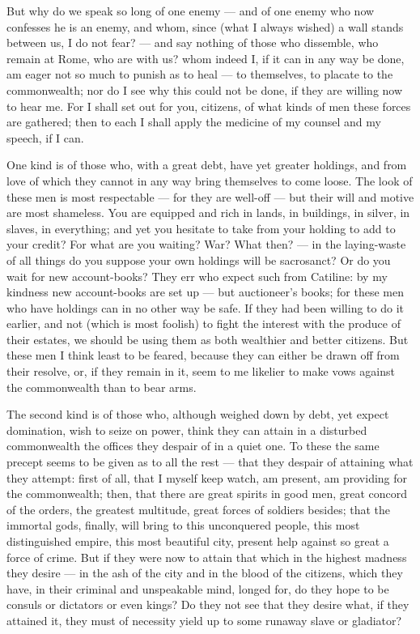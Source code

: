  But why do we speak so long of one enemy --- and of one enemy who now confesses he is an enemy, and whom, since (what I always wished) a wall stands between us, I do not fear? --- and say nothing of those who dissemble, who remain at Rome, who are with us? whom indeed I, if it can in any way be done, am eager not so much to punish as to heal --- to themselves, to placate to the commonwealth; nor do I see why this could not be done, if they are willing now to hear me. For I shall set out for you, citizens, of what kinds of men these forces are gathered; then to each I shall apply the medicine of my counsel and my speech, if I can.

 One kind is of those who, with a great debt, have yet greater holdings, and from love of which they cannot in any way bring themselves to come loose. The look of these men is most respectable --- for they are well-off --- but their will and motive are most shameless. You are equipped and rich in lands, in buildings, in silver, in slaves, in everything; and yet you hesitate to take from your holding to add to your credit? For what are you waiting? War? What then? --- in the laying-waste of all things do you suppose your own holdings will be sacrosanct? Or do you wait for new account-books? They err who expect such from Catiline: by my kindness new account-books are set up --- but auctioneer's books; for these men who have holdings can in no other way be safe. If they had been willing to do it earlier, and not (which is most foolish) to fight the interest with the produce of their estates, we should be using them as both wealthier and better citizens. But these men I think least to be feared, because they can either be drawn off from their resolve, or, if they remain in it, seem to me likelier to make vows against the commonwealth than to bear arms.

 The second kind is of those who, although weighed down by debt, yet expect domination, wish to seize on power, think they can attain in a disturbed commonwealth the offices they despair of in a quiet one. To these the same precept seems to be given as to all the rest --- that they despair of attaining what they attempt: first of all, that I myself keep watch, am present, am providing for the commonwealth; then, that there are great spirits in good men, great concord of the orders, the greatest multitude, great forces of soldiers besides; that the immortal gods, finally, will bring to this unconquered people, this most distinguished empire, this most beautiful city, present help against so great a force of crime. But if they were now to attain that which in the highest madness they desire --- in the ash of the city and in the blood of the citizens, which they have, in their criminal and unspeakable mind, longed for, do they hope to be consuls or dictators or even kings? Do they not see that they desire what, if they attained it, they must of necessity yield up to some runaway slave or gladiator?

